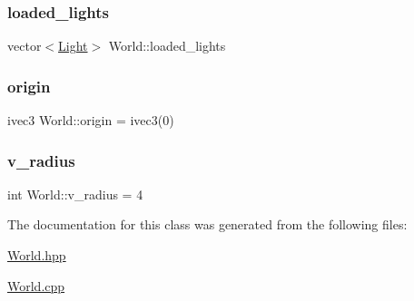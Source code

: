 \mbox{\label{classWorld_a747aff1feb1b8dfd17d400bef91f2183}} 
\subsubsection{\texorpdfstring{loaded\+\_\+lights}{loaded\_lights}}
{\footnotesize\ttfamily vector$<$\mbox{\hyperlink{structLight}{Light}}$>$ World\+::loaded\+\_\+lights\hspace{0.3cm}{\ttfamily [private]}}

\mbox{\label{classWorld_a832a85c0faf5e0e71a26265e1d893285}} 
\subsubsection{\texorpdfstring{origin}{origin}}
{\footnotesize\ttfamily ivec3 World\+::origin = ivec3(0)}

\mbox{\label{classWorld_a055ae0d6d9a2a5f0cc891cc77157a48a}} 
\subsubsection{\texorpdfstring{v\+\_\+radius}{v\_radius}}
{\footnotesize\ttfamily int World\+::v\+\_\+radius = 4}



The documentation for this class was generated from the following files\+:\begin{DoxyCompactItemize}
\item 
\mbox{\hyperlink{World_8hpp}{World.\+hpp}}\item 
\mbox{\hyperlink{World_8cpp}{World.\+cpp}}\end{DoxyCompactItemize}
